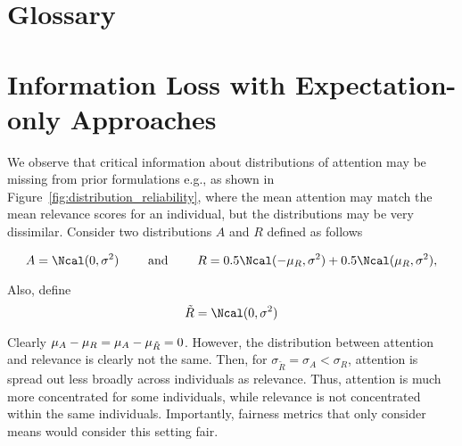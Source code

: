 \appendix




\section{Glossary}
\begin{table}[!htp]
\centering
{}
\caption{Glossary of terms utilized in the paper.}\label{tab:glossary}

\end{table}

\section{Information Loss with Expectation-only Approaches} \label{sec:dist_example}
We observe that critical information about distributions of attention may be missing from prior formulations e.g., as shown in Figure~\ref{fig:distribution_reliability}, where the mean attention may match the mean relevance scores for an individual, but the distributions may be very dissimilar. Consider two distributions $A$ and $R$ defined as follows

\[
A = \Ncal(0, \sigma^2) \quad \quad \text{ and } \quad \quad R = 0.5\Ncal(-\mu_R, \sigma^2) + 0.5\Ncal(\mu_R, \sigma^2),
\]

Also, define $$\Tilde{R} = \Ncal(0, \sigma^2)$$

Clearly $\mu_{A} - \mu_{R} = \mu_{A} - \mu_{\Tilde{R}} = 0$. However, the distribution between attention and relevance is clearly not the same. Then, for $\sigma_{\tilde{R}} = \sigma_A < \sigma_R$, attention is spread out less broadly across individuals as relevance. Thus, attention is much more concentrated for some individuals, while relevance is not concentrated within the same individuals. Importantly, fairness metrics that only consider means would consider this setting fair.


